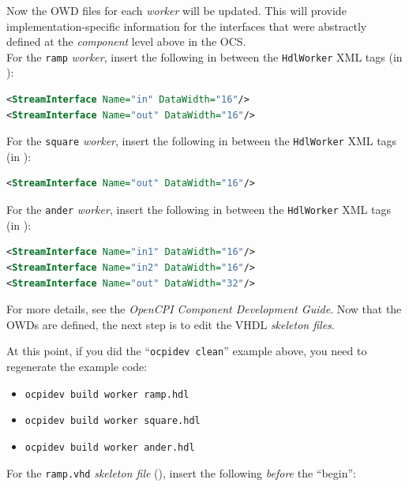 Now the OWD files for each \textit{worker} will be updated. This will provide implementation-specific information for the interfaces that were abstractly defined at the \textit{component} level above in the OCS.\\
\bstart
For the \verb+ramp+ \textit{worker}, insert the following in between the \verb+HdlWorker+ XML tags (in ):

\begin{lstlisting}[language=xml]
<StreamInterface Name="in" DataWidth="16"/>
<StreamInterface Name="out" DataWidth="16"/>
\end{lstlisting}
\bend
\bstart
For the \verb+square+ \textit{worker}, insert the following in between the \verb+HdlWorker+ XML tags (in ):

\begin{lstlisting}[language=xml]
<StreamInterface Name="out" DataWidth="16"/>
\end{lstlisting}
\bend
\bstart
For the \verb+ander+ \textit{worker}, insert the following in between the \verb+HdlWorker+ XML tags (in ):

\begin{lstlisting}[language=xml]
<StreamInterface Name="in1" DataWidth="16"/>
<StreamInterface Name="in2" DataWidth="16"/>
<StreamInterface Name="out" DataWidth="32"/>
\end{lstlisting}
\bend

For more details, see the \textit{OpenCPI Component Development Guide}. Now that the OWDs are defined, the next step is to edit the VHDL \textit{skeleton files}.

\bstart
At this point, if you did the ``\texttt{ocpidev clean}'' example above, you need to regenerate the example code:
\begin{itemize}
\setlength\itemsep{0pt}
\item \texttt{ocpidev build worker ramp.hdl}
\item \texttt{ocpidev build worker square.hdl}
\item \texttt{ocpidev build worker ander.hdl}
\end{itemize}
\bend
\bstart
For the \verb+ramp.vhd+ \textit{skeleton file} (), insert the following \textit{before} the ``begin'':

